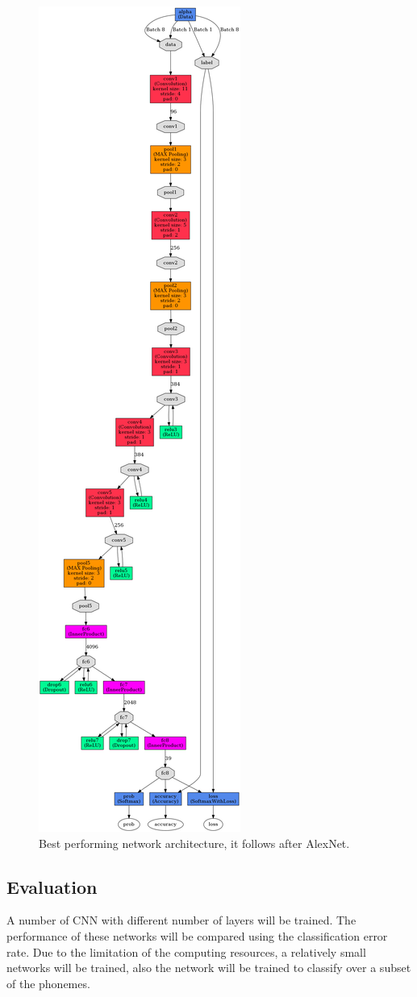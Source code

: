 \begin{figure}
\centering
\includegraphics[scale=0.2]{figs/alexnet}
\caption{\label{fig:net}Best performing network architecture, it follows after AlexNet.}
\end{figure}
\subsection{Evaluation}
A number of CNN with different number of layers will be trained. The performance of these networks will be compared using the classification error rate. Due to the limitation of the computing resources, a relatively small networks will be trained, also the network will be trained to classify over a subset of the phonemes.